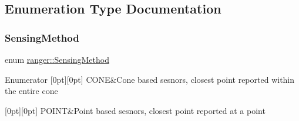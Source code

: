 \subsection{Enumeration Type Documentation}
\mbox{\label{namespaceranger_ab04465c229cc50595ffe40a891a3b135}} 
\subsubsection{\texorpdfstring{Sensing\+Method}{SensingMethod}}
{\footnotesize\ttfamily enum \hyperlink{namespaceranger_ab04465c229cc50595ffe40a891a3b135}{ranger\+::\+Sensing\+Method}}

\begin{DoxyEnumFields}{Enumerator}
[0pt][0pt]{}\mbox{\label{namespaceranger_ab04465c229cc50595ffe40a891a3b135ace9fd8ac6cdd5af7d1ef291eb9fc41af}} 
C\+O\+NE&Cone based sesnors, closest point reported within the entire cone \\
\hline

[0pt][0pt]{}\mbox{\label{namespaceranger_ab04465c229cc50595ffe40a891a3b135a6cd3b981ee1a6dc6afc81a8052d366f3}} 
P\+O\+I\+NT&Point based sesnors, closest point reported at a point \\
\hline

\end{DoxyEnumFields}
